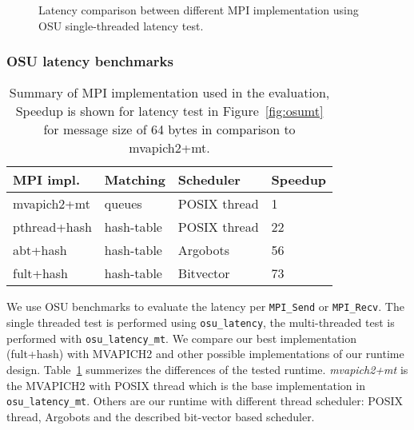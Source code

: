 \begin{figure}[ht]
  \centering

  \caption{Latency comparison between different MPI implementation using OSU single-threaded latency test.\label{fig:osu}}
\end{figure}

\subsubsection{OSU latency benchmarks}
\begin{table}
\begin{tabular}{|l|l|l|l|}
\hline
MPI impl. & Matching & Scheduler & Speedup \\
\hline
mvapich2+mt & queues & POSIX thread & 1 \\
\hline
pthread+hash & hash-table & POSIX thread & 22 \\
\hline
abt+hash & hash-table & Argobots & 56 \\
\hline
fult+hash & hash-table & Bitvector & 73 \\
\hline
\end{tabular}
\caption{Summary of MPI implementation used in the evaluation, Speedup is shown
  for latency test in Figure~\ref{fig:osumt} for message size of 64 bytes in
  comparison to mvapich2+mt.\label{tbl:mpi}}
\end{table}

We use OSU benchmarks \cite{osubench} to evaluate the latency per
\texttt{MPI_Send} or \texttt{MPI_Recv}. The single threaded test is performed
using \texttt{osu_latency}, the multi-threaded test is performed with
\texttt{osu_latency_mt}. We compare our best implementation (fult+hash) with
MVAPICH2 and other possible implementations of our runtime design.
Table~\ref{tbl:mpi} summerizes the differences of the tested runtime.
\textit{mvapich2+mt} is the MVAPICH2 with POSIX thread which is the base
implementation in \texttt{osu_latency_mt}. Others are our runtime
with different thread scheduler: POSIX thread, Argobots and the described
bit-vector based scheduler.

